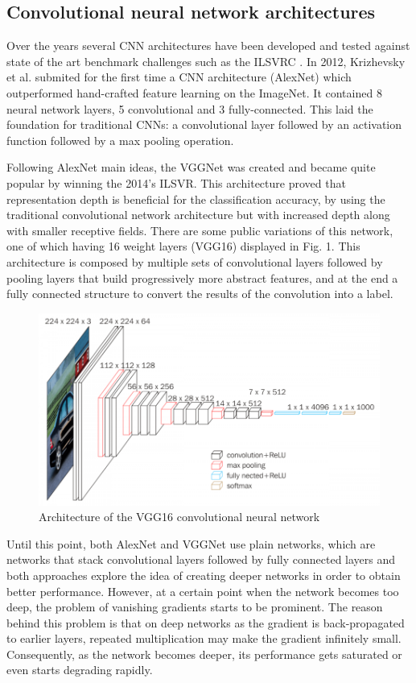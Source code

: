 \subsection{Convolutional neural network architectures}
Over the years several \ac{CNN} architectures have been developed and tested against state of the art benchmark challenges such as the \ac{ILSVRC} \cite{ilsvrc}. In 2012, Krizhevsky et al. \cite{alexnet} submited for the first time a \ac{CNN} architecture (AlexNet) which outperformed hand-crafted feature learning on the ImageNet. It contained 8 neural network layers, 5 convolutional and 3 fully-connected. This laid the foundation for traditional \ac{CNN}s: a convolutional layer followed by an activation function followed by a max pooling operation. \par
Following AlexNet main ideas, the VGGNet\cite{vggnet} was created and became quite popular by winning the 2014’s ILSVR. This architecture proved that representation depth is beneficial for the classification accuracy, by using the traditional convolutional network architecture but with increased depth along with smaller receptive fields. There are some public variations of this network, one of which having 16 weight layers (VGG16) displayed in Fig. 1. This architecture is composed by multiple sets of convolutional layers followed by pooling layers that build progressively more abstract features, and at the end a fully connected structure to convert the results of the convolution into a label.
\begin{figure}[ht]
  \centering
    \includegraphics[scale=0.5, width=\linewidth]{figs/vgg16.png}
  \caption{Architecture of the VGG16 convolutional neural network \cite{vggnet}}
\end{figure}
\par
Until this point, both AlexNet and VGGNet use plain networks, which are networks that stack convolutional layers followed by fully connected layers and both approaches explore the idea of creating deeper networks in order to obtain better performance. However, at a certain point when the network becomes too deep, the problem of vanishing gradients starts to be prominent. The reason behind this problem is that on deep networks as the gradient is back-propagated to earlier layers, repeated multiplication may make the gradient infinitely small. Consequently, as the network becomes  deeper, its performance gets saturated or even starts degrading rapidly. \par

